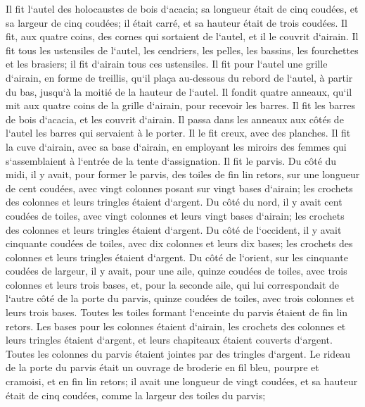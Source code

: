 \verse Il fit l`autel des holocaustes de bois d`acacia; sa longueur était de cinq coudées, et sa largeur de cinq coudées; il était carré, et sa hauteur était de trois coudées. 
\verse Il fit, aux quatre coins, des cornes qui sortaient de l`autel, et il le couvrit d`airain. 
\verse Il fit tous les ustensiles de l`autel, les cendriers, les pelles, les bassins, les fourchettes et les brasiers; il fit d`airain tous ces ustensiles. 
\verse Il fit pour l`autel une grille d`airain, en forme de treillis, qu`il plaça au-dessous du rebord de l`autel, à partir du bas, jusqu`à la moitié de la hauteur de l`autel. 
\verse Il fondit quatre anneaux, qu`il mit aux quatre coins de la grille d`airain, pour recevoir les barres. 
\verse Il fit les barres de bois d`acacia, et les couvrit d`airain. 
\verse Il passa dans les anneaux aux côtés de l`autel les barres qui servaient à le porter. Il le fit creux, avec des planches. 
\verse Il fit la cuve d`airain, avec sa base d`airain, en employant les miroirs des femmes qui s`assemblaient à l`entrée de la tente d`assignation. 
\verse Il fit le parvis. Du côté du midi, il y avait, pour former le parvis, des toiles de fin lin retors, sur une longueur de cent coudées, 
\verse avec vingt colonnes posant sur vingt bases d`airain; les crochets des colonnes et leurs tringles étaient d`argent. 
\verse Du côté du nord, il y avait cent coudées de toiles, avec vingt colonnes et leurs vingt bases d`airain; les crochets des colonnes et leurs tringles étaient d`argent. 
\verse Du côté de l`occident, il y avait cinquante coudées de toiles, avec dix colonnes et leurs dix bases; les crochets des colonnes et leurs tringles étaient d`argent. 
\verse Du côté de l`orient, sur les cinquante coudées de largeur, 
\verse il y avait, pour une aile, quinze coudées de toiles, avec trois colonnes et leurs trois bases, 
\verse et, pour la seconde aile, qui lui correspondait de l`autre côté de la porte du parvis, quinze coudées de toiles, avec trois colonnes et leurs trois bases. 
\verse Toutes les toiles formant l`enceinte du parvis étaient de fin lin retors. 
\verse Les bases pour les colonnes étaient d`airain, les crochets des colonnes et leurs tringles étaient d`argent, et leurs chapiteaux étaient couverts d`argent. Toutes les colonnes du parvis étaient jointes par des tringles d`argent. 
\verse Le rideau de la porte du parvis était un ouvrage de broderie en fil bleu, pourpre et cramoisi, et en fin lin retors; il avait une longueur de vingt coudées, et sa hauteur était de cinq coudées, comme la largeur des toiles du parvis; 
